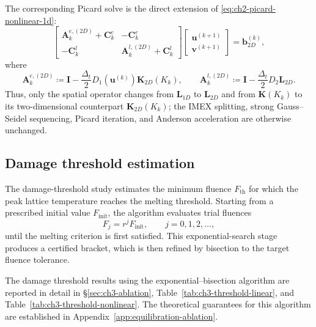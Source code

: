 The corresponding Picard solve is the direct extension of \eqref{eq:ch2-picard-nonlinear-1d}:
\begin{equation}
    \begin{bmatrix}
        \mathbf{A}^{e,(2D)}_{k} + \mathbf{C}^{e}_{k} & -\mathbf{C}^{e}_{k}                          \\
        -\mathbf{C}^{l}_{k}                          & \mathbf{A}^{l,(2D)}_{k} + \mathbf{C}^{l}_{k}
    \end{bmatrix}
    \begin{bmatrix}
        \mathbf{u}^{(k+1)} \\
        \mathbf{v}^{(k+1)}
    \end{bmatrix}
    =
    \mathbf{b}^{(k)}_{2D},
    \label{eq:ch2-picard-nonlinear-2d}
\end{equation}
where
\[
    \mathbf{A}^{e,(2D)}_{k}
    \coloneqq
    \mathbf{I}
    -
    \frac{\Delta_t}{2}
    D_1(\mathbf{u}^{(k)}) \mathbf{K}_{2D}(K_k),
    \qquad
    \mathbf{A}^{l,(2D)}_{k}
    \coloneqq
    \mathbf{I}
    -
    \frac{\Delta_t}{2}
    D_2 \mathbf{L}_{2D}.
\]
Thus, only the spatial operator changes from \(\mathbf{L}_{1D}\) to \(\mathbf{L}_{2D}\) and from \(\mathbf{K}(K_k)\) to its two-dimensional counterpart \(\mathbf{K}_{2D}(K_k)\); the IMEX splitting, strong Gauss--Seidel sequencing, Picard iteration, and Anderson acceleration are otherwise unchanged.

\subsection{Damage threshold estimation}
\label{sec:ch2-threshold}

The damage-threshold study estimates the minimum fluence \(F_{\mathrm{th}}\)
for which the peak lattice temperature reaches the melting threshold. Starting
from a prescribed initial value \(F_{\mathrm{init}}\), the algorithm evaluates
trial fluences
\[
    F_j = r^j F_{\mathrm{init}},
    \qquad j = 0,1,2,\dotsc,
\]
until the melting criterion is first satisfied. This exponential-search stage
produces a certified bracket, which is then refined by bisection to the target
fluence tolerance.

The damage threshold results using the exponential--bisection algorithm are
reported in detail in \S\ref{sec:ch3-ablation},
Table~\ref{tab:ch3-threshold-linear}, and
Table~\ref{tab:ch3-threshold-nonlinear}. The theoretical guarantees for this
algorithm are established in Appendix~\ref{app:equilibration-ablation}.

